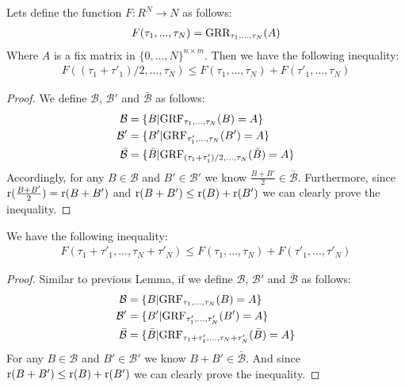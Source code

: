 \documentclass{article}
\begin{document}
\begin{thm:lemma}

Lets define the function $F: R^N \rightarrow N$ as follows:
\begin{align}
F(\tau_{1},...,\tau_{N})= \text{GRR}_{\tau_1,...,\tau_N}(A) 
\end{align}
Where $A$ is a fix matrix in $\{0,...,N\}^{n\times m}$. Then we have the following inequality:
\begin{align}
F((\tau_{1}+\tau'_{1})/2,...,\tau_{N}) \leq F(\tau_{1},...,\tau_{N})+F(\tau'_{1},...,\tau_{N})
\end{align}
\begin{proof}
We define $\mathcal{B}$, $\mathcal{B}'$ and $\bar {\mathcal{B}}$ as follows:
\begin{align}
\mathcal{B} &=\{B|\text{GRF}_{\tau_1,...,\tau_N}(B)=A\}\\
\mathcal{B}' &=\{B'|\text{GRF}_{\tau_1',...,\tau_N}(B')=A\}\\
\bar {\mathcal{B}} &=\{\bar B|\text{GRF}_{(\tau_{1}+\tau_{1}')/2,...,\tau_N}(\bar B)=A\} 
\end{align}
Accordingly, for any $B\in \mathcal{B}$ and $B' \in \mathcal{B}'$ we know $\frac{B+B'}{2}\in \bar {\mathcal{B}}$. Furthermore, since $\mathrm{r}(\frac{B+B'}{2})=\mathrm{r}(B+B')$ and $\mathrm{r}(B+B') \leq \mathrm{r}(B)+\mathrm{r}(B')$ we can clearly prove the inequality.
\end{proof}
\end{thm:lemma}


\begin{thm:lemma}
We have the following inequality: 
\begin{align}
F(\tau_{1}+\tau'_{1},...,\tau_{N}+\tau'_{N}) \leq  F(\tau_{1},...,\tau_{N})+F(\tau'_{1},...,\tau'_{N})
\end{align}
\begin{proof}
Similar to previous Lemma, if we define $\mathcal{B}$, $\mathcal{B}'$ and $\bar {\mathcal{B}}$ as follows:
\begin{align}
\mathcal{B} &=\{B|\text{GRF}_{\tau_1,...,\tau_N}(B)=A\}\\
\mathcal{B}' &=\{B'|\text{GRF}_{\tau_1',...,\tau_N'}(B')=A\}\\
\bar {\mathcal{B}} &=\{\bar B|\text{GRF}_{\tau_{1}+\tau_{1}',...,\tau_N+\tau_{N}'}(\bar B)=A\} 
\end{align}
For any $B\in \mathcal{B}$ and $B' \in \mathcal{B}'$ we know $B+B'\in \bar {\mathcal{B}}$. And since $\mathrm{r}(B+B') \leq \mathrm{r}(B)+\mathrm{r}(B')$ we can clearly prove the inequality.
\end{proof}
\end{thm:lemma}
\end{document}
